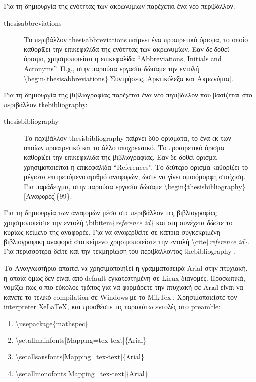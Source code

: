 \documentclass{dithesis}
\begin{document}
    Για τη δημιουργία της ενότητας των ακρωνυμίων παρέχεται ένα νέο περιβάλλον:
    \begin{description}
    \item[thesisabbreviations]
      Το περιβάλλον thesisabbreviations παίρνει ένα προαιρετικό όρισμα, το οποίο 
      καθορίζει την επικεφαλίδα της ενότητας των ακρωνυμίων.
      Εαν δε δοθεί όρισμα, χρησιμοποιείται η επικεφαλίδα ``Abbreviations, Initials
      and Acronyms''.
      Π.χ., στην παρούσα εργασία δώσαμε την εντολή
      \textbackslash{begin}\{thesisabbreviations\}{[Συντμήσεις, Αρκτικόλεξα και
      Ακρωνύμια]}.
    \end{description}

    Για τη δημιουργία της βιβλιογραφίας παρέχεται ένα νέο περιβάλλον που
    βασίζεται στο περιβάλλον thebibliography:
    \begin{description}
    \item[thesisbibliography]
      Το περιβάλλον thesisbibliography παίρνει δύο ορίσματα, το ένα εκ των οποίων
      προαιρετικό και το άλλο υποχρεωτικό.
      Το προαιρετικό όρισμα καθορίζει την επικεφαλίδα της βιβλιογραφίας.
      Εαν δε δοθεί όρισμα, χρησιμοποιείται η επικεφαλίδα ``References''.
      Το δεύτερο όρισμα καθορίζει το μέγιστο επιτρεπόμενο αριθμό αναφορών, ώστε
      να γίνει ομοιόμορφη στοίχιση.
      Για παράδειγμα, στην παρούσα εργασία δώσαμε
      \textbackslash{begin}\{thesisbibliography\}{[Αναφορές]}\{99\}.
    \end{description}

    Για τη δημιουργία των αναφορών μέσα στο περιβάλλον της βιβλιογραφίας 
    χρησιμοποιείστε την εντολή \textbackslash{bibitem}\{\textit{reference id}\} και
    στη συνέχεια δώστε το κυρίως κείμενο της αναφοράς.
    Για να αναφερθείτε σε κάποια συγκεκριμένη βιβλιογραφική αναφορά στο κείμενο
    χρησιμοποιείστε την εντολή \textbackslash{cite}\{\textit{reference id}\}.
    Για περισσότερα δείτε και την τεκμηρίωση του περιβάλλοντος thebibliography
    \cite{Bibliography}.

    Το Αναγνωστήριο απαιτεί να χρησιμοποιηθεί η γραμματοσειρά Arial στην πτυχιακή,
    η οποία όμως δεν είναι από default εγκατεστημένη σε Linux διανομές.
    Προσωπικά, νομίζω πως ο πιο εύκολος τρόπος για να φορμάρετε την πτυχιακή σε
    Arial είναι να κάνετε το τελικό compilation σε Windows με το MikTex 
    \cite{Miktex}.
    Χρησιμοποιείστε τον interpreter XeLaTeX, και προσθέστε τις παρακάτω
    εντολές στο preamble:
    \begin{enumerate}
    \item
      \textbackslash{usepackage}\{mathspec\}
    \item
      \textbackslash{setallmainfonts}{[Mapping=tex-text]}\{Arial\}
    \item
      \textbackslash{setallsansfonts}{[Mapping=tex-text]}\{Arial\}
    \item
      \textbackslash{setallmonofonts}{[Mapping=tex-text]}\{Arial\}
    \end{enumerate}
\end{document}
